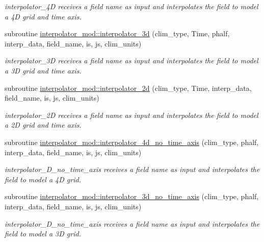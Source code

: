 \begin{DoxyCompactItemize}
\begin{DoxyCompactList}\small\item\em interpolator\+\_\+4D receives a field name as input and interpolates the field to model a 4D grid and time axis. \end{DoxyCompactList}\item 
subroutine \hyperlink{namespaceinterpolator__mod_ab04eaf1ed57ea3a211ee4f99a3485ab3}{interpolator\+\_\+mod\+::interpolator\+\_\+3d} (clim\+\_\+type, Time, phalf, interp\+\_\+data, field\+\_\+name, is, js, clim\+\_\+units)
\begin{DoxyCompactList}\small\item\em interpolator\+\_\+3D receives a field name as input and interpolates the field to model a 3D grid and time axis. \end{DoxyCompactList}\item 
subroutine \hyperlink{namespaceinterpolator__mod_a55df96af3f7f130686daf079e95f248a}{interpolator\+\_\+mod\+::interpolator\+\_\+2d} (clim\+\_\+type, Time, interp\+\_\+data, field\+\_\+name, is, js, clim\+\_\+units)
\begin{DoxyCompactList}\small\item\em interpolator\+\_\+2D receives a field name as input and interpolates the field to model a 2D grid and time axis. \end{DoxyCompactList}\item 
subroutine \hyperlink{namespaceinterpolator__mod_afe3e54b412fafba9458282b5982be15a}{interpolator\+\_\+mod\+::interpolator\+\_\+4d\+\_\+no\+\_\+time\+\_\+axis} (clim\+\_\+type, phalf, interp\+\_\+data, field\+\_\+name, is, js, clim\+\_\+units)
\begin{DoxyCompactList}\small\item\em interpolator\+\_\+D\+\_\+no\+\_\+time\+\_\+axis receives a field name as input and interpolates the field to model a 4D grid. \end{DoxyCompactList}\item 
subroutine \hyperlink{namespaceinterpolator__mod_aeb3700c595f4ad78698cd2905b4de9e0}{interpolator\+\_\+mod\+::interpolator\+\_\+3d\+\_\+no\+\_\+time\+\_\+axis} (clim\+\_\+type, phalf, interp\+\_\+data, field\+\_\+name, is, js, clim\+\_\+units)
\begin{DoxyCompactList}\small\item\em interpolator\+\_\+D\+\_\+no\+\_\+time\+\_\+axis receives a field name as input and interpolates the field to model a 3D grid. \end{DoxyCompactList}\item 

\end{DoxyCompactItemize}
